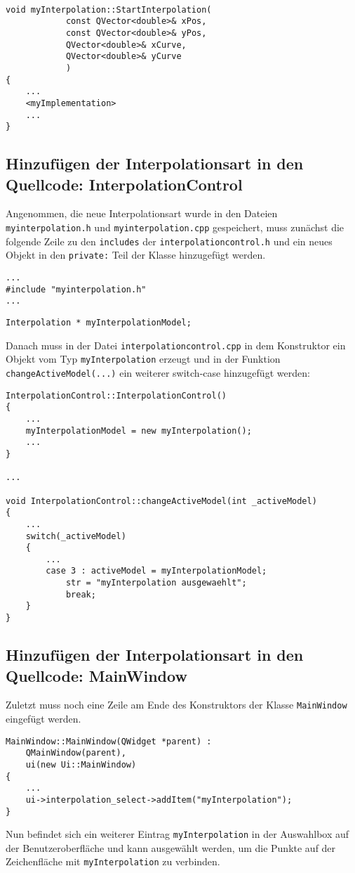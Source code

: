 \begin{lstlisting}

void myInterpolation::StartInterpolation(
            const QVector<double>& xPos,
            const QVector<double>& yPos,
            QVector<double>& xCurve,
            QVector<double>& yCurve
            )
{
	...
	<myImplementation>
	...
}

\end{lstlisting}

\subsection{Hinzuf\"ugen der Interpolationsart in den Quellcode: InterpolationControl}
Angenommen, die neue Interpolationsart wurde in den Dateien {\tt myinterpolation.h} und {\tt myinterpolation.cpp} gespeichert, muss zun\"achst die folgende Zeile zu den {\tt includes} der {\tt interpolationcontrol.h} und ein neues Objekt in den {\tt private:} Teil der Klasse hinzugef\"ugt werden. 

\begin{lstlisting}
...
#include "myinterpolation.h"
...
\end{lstlisting}

\begin{lstlisting}
Interpolation * myInterpolationModel;
\end{lstlisting}

Danach muss in der Datei {\tt interpolationcontrol.cpp} in dem Konstruktor ein Objekt vom Typ {\tt myInterpolation} erzeugt  und in der Funktion {\tt changeActiveModel(...)} ein weiterer switch-case hinzugef\"ugt werden:

\begin{lstlisting} 
InterpolationControl::InterpolationControl()
{
	...
	myInterpolationModel = new myInterpolation();
	...
}

...

void InterpolationControl::changeActiveModel(int _activeModel)
{
	...
	switch(_activeModel)
	{
		...
		case 3 : activeModel = myInterpolationModel;
			str = "myInterpolation ausgewaehlt";
			break;
	}
}
\end{lstlisting}

\subsection{Hinzuf\"ugen der Interpolationsart in den Quellcode: MainWindow}
Zuletzt muss noch eine Zeile am Ende des Konstruktors der Klasse {\tt MainWindow} eingef\"ugt werden.
\begin{lstlisting}
MainWindow::MainWindow(QWidget *parent) :
    QMainWindow(parent),
    ui(new Ui::MainWindow)
{
	...
	ui->interpolation_select->addItem("myInterpolation");
}
\end{lstlisting}
Nun befindet sich ein weiterer Eintrag {\tt myInterpolation} in der Auswahlbox auf der Benutzeroberfl\"ache und kann ausgew\"ahlt werden, um die Punkte auf der Zeichenfl\"ache mit {\tt myInterpolation} zu verbinden.

